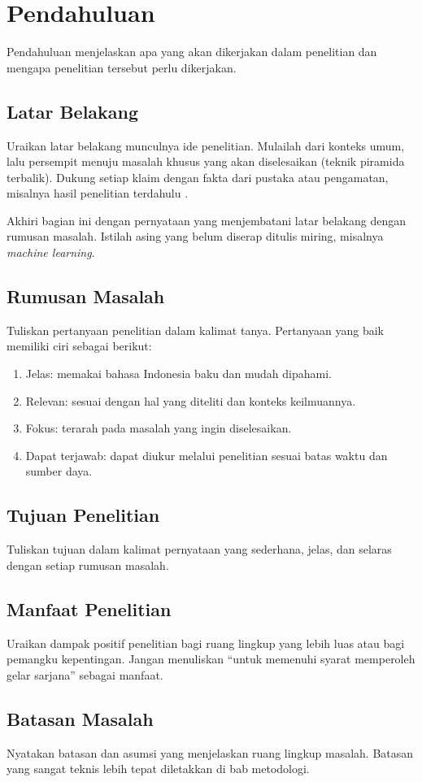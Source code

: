 \chapter{Pendahuluan}
Pendahuluan menjelaskan apa yang akan dikerjakan dalam penelitian dan mengapa
penelitian tersebut perlu dikerjakan.

\section{Latar Belakang}
Uraikan latar belakang munculnya ide penelitian. Mulailah dari konteks umum,
lalu persempit menuju masalah khusus yang akan diselesaikan (teknik piramida
terbalik). Dukung setiap klaim dengan fakta dari pustaka atau pengamatan,
misalnya hasil penelitian terdahulu \cite{lecun1998gradient,vaswani2017attention}.

Akhiri bagian ini dengan pernyataan yang menjembatani latar belakang dengan
rumusan masalah. Istilah asing yang belum diserap ditulis miring, misalnya
\textit{machine learning}.

\section{Rumusan Masalah}
Tuliskan pertanyaan penelitian dalam kalimat tanya. Pertanyaan yang baik
memiliki ciri sebagai berikut:
\begin{enumerate}
  \item Jelas: memakai bahasa Indonesia baku dan mudah dipahami.
  \item Relevan: sesuai dengan hal yang diteliti dan konteks keilmuannya.
  \item Fokus: terarah pada masalah yang ingin diselesaikan.
  \item Dapat terjawab: dapat diukur melalui penelitian sesuai batas waktu dan
        sumber daya.
\end{enumerate}

\section{Tujuan Penelitian}
Tuliskan tujuan dalam kalimat pernyataan yang sederhana, jelas, dan selaras
dengan setiap rumusan masalah.

\section{Manfaat Penelitian}
Uraikan dampak positif penelitian bagi ruang lingkup yang lebih luas atau bagi
pemangku kepentingan. Jangan menuliskan ``untuk memenuhi syarat memperoleh gelar
sarjana'' sebagai manfaat.

\section{Batasan Masalah}
Nyatakan batasan dan asumsi yang menjelaskan ruang lingkup masalah. Batasan yang
sangat teknis lebih tepat diletakkan di bab metodologi.

